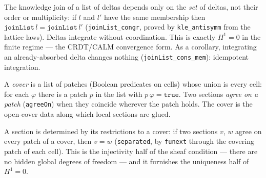 \begin{theorem}\label{thm:vanishing-h1-crdt}\leanok{}
The knowledge join of a list of deltas depends only on the \emph{set} of deltas, not their order or multiplicity: if $l$ and $l'$ have the same membership then $\texttt{joinList}\,l = \texttt{joinList}\,l'$ (\texttt{joinList\_congr}, proved by \texttt{kle\_antisymm} from the lattice laws). Deltas integrate without coordination. This is exactly $H^1 = 0$ in the finite regime --- the CRDT/CALM convergence form. As a corollary, integrating an already-absorbed delta changes nothing (\texttt{joinList\_cons\_mem}): idempotent integration.
\end{theorem}
\begin{proposition}\label{thm:sheaf-cover}\leanok{}
A \emph{cover} is a list of patches (Boolean predicates on cells) whose union is every cell: for each $\varphi$ there is a patch $p$ in the list with $p\,\varphi = \texttt{true}$. Two sections \emph{agree on a patch} (\texttt{agreeOn}) when they coincide wherever the patch holds. The cover is the open-cover data along which local sections are glued.
\end{proposition}
\begin{theorem}\label{thm:sheaf-separated}\leanok{}
A section is determined by its restrictions to a cover: if two sections $v$, $w$ agree on every patch of a cover, then $v = w$ (\texttt{separated}, by \texttt{funext} through the covering patch of each cell). This is the injectivity half of the sheaf condition --- there are no hidden global degrees of freedom --- and it furnishes the uniqueness half of $H^1 = 0$.
\end{theorem}
